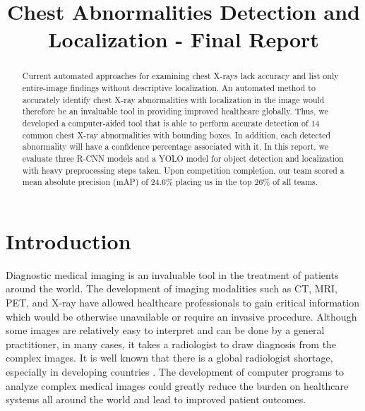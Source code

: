 \documentclass[conference]{IEEEtran}
\begin{document}
\title{Chest Abnormalities Detection and Localization - Final Report \\
}

\author{
\and
{}
\and
{}
}

\maketitle

\begin{abstract}
    Current automated approaches for examining chest X-rays lack accuracy and list only entire-image findings without descriptive localization. An automated method to accurately identify chest X-ray abnormalities with localization in the image would therefore be an invaluable tool in providing improved healthcare globally. Thus, we developed a computer-aided tool that is able to perform accurate detection of 14 common chest X-ray abnormalities with bounding boxes. In addition, each detected abnormality will have a confidence percentage associated with it. In this report, we evaluate three R-CNN models and a YOLO model for object detection and localization with heavy preprocessing steps taken. Upon competition completion, our team scored a mean absolute precision (mAP) of 24.6\% placing us in the top 26\% of all teams. 
\end{abstract}

\section{Introduction} \label{intro}
Diagnostic medical imaging is an invaluable tool in the treatment of patients around the world. The development of imaging modalities such as CT, MRI, PET, and X-ray have allowed healthcare professionals to gain critical information which would be otherwise unavailable or require an invasive procedure. Although some images are relatively easy to interpret and can be done by a general practitioner, in many cases, it takes a radiologist to draw diagnosis from the complex images.
It is well known that there is a global radiologist shortage, especially in developing countries \cite{rimmer2017radiologist}. The development of computer programs to analyze complex medical images could greatly reduce the burden on healthcare systems all around the world and lead to improved patient outcomes.
\end{document}
